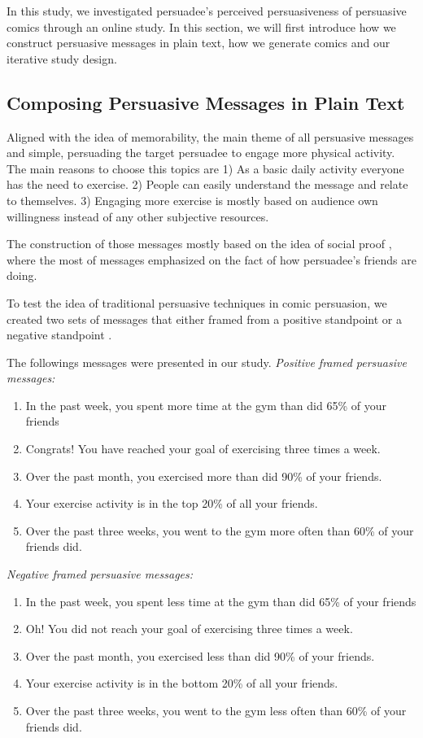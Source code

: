 In this study, we investigated persuadee's perceived persuasiveness of persuasive comics through an online study. In this section, we will first introduce how we construct persuasive messages in plain text, how we generate comics and our iterative study design.

\subsection{Composing Persuasive Messages in Plain Text}
Aligned with the idea of memorability, the main theme of all persuasive messages and simple, persuading the target persuadee to engage more physical activity. The main reasons to choose this topics are 1) As a basic daily activity everyone has the need to exercise. 2) People can easily understand the message and relate to themselves. 3) Engaging more exercise is mostly based on audience own willingness instead of any other subjective resources.

The construction of those messages mostly based on the idea of social proof \cite{goldstein2008room}, where the most of messages emphasized on the fact of how persuadee's friends are doing.

To test the idea of traditional persuasive techniques in comic persuasion, we created two sets of messages that either framed from a positive standpoint or a negative standpoint \cite{tversky1981framing}.

The followings messages were presented in our study.
\textit{Positive framed persuasive messages:}
\begin{enumerate}
 \item In the past week, you spent more time at the gym than did 65\% of your friends
 \item Congrats! You have reached your goal of exercising three times a week.
 \item Over the past month, you exercised more than did 90\% of your friends.
 \item Your exercise activity is in the top 20\% of all your friends.
 \item Over the past three weeks, you went to the gym more often than 60\% of your friends did.
\end{enumerate}\par
\textit{Negative framed persuasive messages:}
\begin{enumerate}
 \item	In the past week, you spent less time at the gym than did 65\% of your friends
 \item  Oh! You did not reach your goal of exercising three times a week.
 \item	Over the past month, you exercised less than did 90\% of your friends.
 \item	Your exercise activity is in the bottom 20\% of all your friends.
 \item	Over the past three weeks, you went to the gym less often than 60\% of your friends did.
\end{enumerate}

